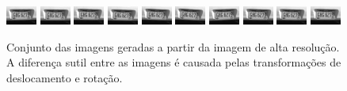 \begin{figure}[H]
	\centering
	\caption{\label{fig:frames}
	Conjunto das imagens geradas a partir da imagem de alta resolução. A diferença sutil entre as imagens é causada pelas transformações de deslocamento e rotação.}
	\includegraphics{figures/degradedImg2/result-0.png}
	\includegraphics{figures/degradedImg2/result-1.png}
	\includegraphics{figures/degradedImg2/result-2.png}
	\includegraphics{figures/degradedImg2/result-3.png}
	\includegraphics{figures/degradedImg2/result-4.png}
	\includegraphics{figures/degradedImg2/result-5.png}
	\includegraphics{figures/degradedImg2/result-6.png}
	\includegraphics{figures/degradedImg2/result-7.png}
	\includegraphics{figures/degradedImg2/result-8.png}
	\includegraphics{figures/degradedImg2/result-9.png} 


\end{figure}
